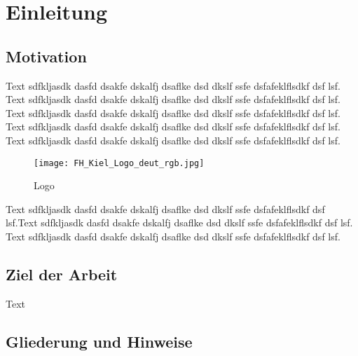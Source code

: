 \chapter{Einleitung}
\label{ch:einleitung}

\section{Motivation}
\label{sec:motivation}

Text sdfkljasdk dasfd dsakfe dskalfj dsaflke dsd dkslf ssfe dsfafeklflsdkf dsf lsf. Text sdfkljasdk dasfd dsakfe dskalfj dsaflke dsd dkslf ssfe dsfafeklflsdkf dsf lsf. Text sdfkljasdk dasfd dsakfe dskalfj dsaflke dsd dkslf ssfe dsfafeklflsdkf dsf lsf. Text sdfkljasdk dasfd dsakfe dskalfj dsaflke dsd dkslf ssfe dsfafeklflsdkf dsf lsf. Text sdfkljasdk dasfd dsakfe dskalfj dsaflke dsd dkslf ssfe dsfafeklflsdkf dsf lsf.

\begin{figure}[ht]
	\centering
	\texttt{[image: FH\_Kiel\_Logo\_deut\_rgb.jpg]}
	\caption{Logo}
	\label{fig:fhlogo}
\end{figure}

Text sdfkljasdk dasfd dsakfe dskalfj dsaflke dsd dkslf ssfe dsfafeklflsdkf dsf lsf.Text sdfkljasdk dasfd dsakfe dskalfj dsaflke dsd dkslf ssfe dsfafeklflsdkf dsf lsf. Text sdfkljasdk dasfd dsakfe dskalfj dsaflke dsd dkslf ssfe dsfafeklflsdkf dsf lsf. \cite{gasparovic1969}
\section{Ziel der Arbeit}
\label{sec:ziel}
Text

\section{Gliederung und Hinweise}
\label{sec:gliederung}

\blindtext[2]

\blindtext[3]

\blindtext[5]

\blindtext[3]